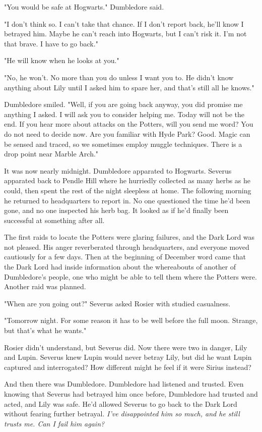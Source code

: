 "You would be safe at Hogwarts." Dumbledore said.

"I don't think so. I can't take that chance. If I don't report back, he'll know I betrayed him. Maybe he can't reach into Hogwarts, but I can't risk it. I'm not that brave. I have to go back."

"He will know when he looks at you."

"No, he won't. No more than you do unless I want you to. He didn't know anything about Lily until I asked him to spare her, and that's still all he knows."

Dumbledore smiled. "Well, if you are going back anyway, you did promise me anything I asked. I will ask you to consider helping me. Today will not be the end. If you hear more about attacks on the Potters, will you send me word? You do not need to decide now. Are you familiar with Hyde Park? Good. Magic can be sensed and traced, so we sometimes employ muggle techniques. There is a drop point near Marble Arch."

It was now nearly midnight. Dumbledore apparated to Hogwarts. Severus apparated back to Pendle Hill where he hurriedly collected as many herbs as he could, then spent the rest of the night sleepless at home. The following morning he returned to headquarters to report in. No one questioned the time he'd been gone, and no one inspected his herb bag. It looked as if he'd finally been successful at something after all.

The first raids to locate the Potters were glaring failures, and the Dark Lord was not pleased. His anger reverberated through headquarters, and everyone moved cautiously for a few days. Then at the beginning of December word came that the Dark Lord had inside information about the whereabouts of another of Dumbledore's people, one who might be able to tell them where the Potters were. Another raid was planned.

"When are you going out?" Severus asked Rosier with studied casualness.

"Tomorrow night. For some reason it has to be well before the full moon. Strange, but that's what he wants."

Rosier didn't understand, but Severus did. Now there were two in danger, Lily and Lupin. Severus knew Lupin would never betray Lily, but did he want Lupin captured and interrogated? How different might he feel if it were Sirius instead?

And then there was Dumbledore. Dumbledore had listened and trusted. Even knowing that Severus had betrayed him once before, Dumbledore had trusted and acted, and Lily was safe. He'd allowed Severus to go back to the Dark Lord without fearing further betrayal. \emph{I've disappointed him so much, and he still trusts me. Can I fail him again?}

